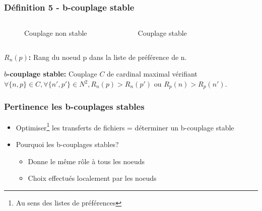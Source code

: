 \documentclass[aspectratio=43]{beamer}
\begin{document}
\begin{frame}
\frametitle{Définition 5 - b-couplage stable}
\begin{columns}
\begin{figure}
    \caption{Couplage non stable}
    \end{figure}

\begin{figure}
    \caption{Couplage stable}
    \end{figure}
\end{columns}
 
    \vspace{1cm}
    \textbf{$R_n(p)$:} Rang du noeud p dans la liste de préférence de n.
    
    \textbf{$b$-couplage stable:} Couplage $C$ de cardinal maximal vérifiant $\forall \{n, p\}\in C, \forall \{n', p'\} \in N^{2}, R_n(p) > R_n(p')$ ou $R_p(n) > R_p(n')$.
\end{frame}



\begin{frame}
\frametitle{Pertinence les b-couplages stables}
    \begin{itemize}
        \item Optimiser\footnote{Au sens des listes de préférences} les transferts de fichiers = déterminer un b-couplage stable
        \item Pourquoi les b-couplages stables?
        \begin{itemize}
            \item Donne le même rôle à tous les noeuds
            \item Choix effectués localement par les noeuds
        \end{itemize}
    \end{itemize}
\end{frame}
\end{document}
